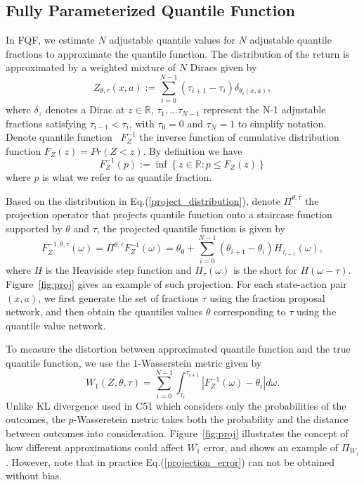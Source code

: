 \documentclass{article}
\begin{document}
\subsection{Fully Parameterized Quantile Function}
In FQF, we estimate $N$ adjustable quantile values for $N$ adjustable quantile fractions to approximate the quantile function. The distribution of the return is approximated by a weighted mixture of $N$ Diracs given by
\begin{equation}
\label{project_distribution}
    Z_{\theta, \tau}(x, a):=\sum_{i=0}^{N-1}(\tau_{i+1} - \tau_{i})\delta_{\theta_i(x, a)},
\end{equation}
where $\delta_z$ denotes a Dirac at $z \in \mathbb{R}$, $\tau_1,...\tau_{N-1}$ represent the N-1 adjustable fractions satisfying $\tau_{i-1} < \tau_i$, with $\tau_0=0$ and $\tau_N=1$ to simplify notation. Denote quantile function~\citep{muller1997integral} $F^{-1}_Z$ the inverse function of cumulative distribution function $F_Z(z)=Pr(Z<z)$. By definition we have
\begin{equation*}
   F_{Z}^{-1}(p) :=\inf \left\{z \in \mathbb{R} : p \leq F_{Z}(z)\right\}
\end{equation*}
where $p$ is what we refer to as quantile fraction.

Based on the distribution in Eq.(\ref{project_distribution}), denote $\Pi^{\theta, \tau}$ the projection operator that projects quantile function onto a staircase function supported by $\theta$ and $\tau$, the projected quantile function is given by
\begin{equation*}
    F^{-1,\theta,\tau}_{Z}(\omega)=\Pi^{\theta, \tau} F^{-1}_{Z}(\omega)=
    \theta_0+\sum_{i=0}^{N-1} (\theta_{i+1}-\theta_{i})H_{\tau_{i+1}}(\omega),
\end{equation*}
where $H$ is the Heaviside step function and $H_\tau(\omega)$ is the short for $H(\omega-\tau)$. Figure~\ref{fig:proj} gives an example of such projection. For each state-action pair $(x,a)$, we first generate the set of fractions $\tau$ using the fraction proposal network, and then obtain the quantiles values $\theta$ corresponding to $\tau$ using the quantile value network. 

To measure the distortion between approximated quantile function and the true quantile function, we use the $1$-Wasserstein metric given by
\begin{equation}
\label{projection_error}
    W_{1}(Z, \theta, \tau)=\sum_{i=0}^{N-1} \int_{\tau_{i}}^{\tau_{i+1}}\left|F^{-1}_{Z}(\omega)-\theta_{i}\right| d \omega.
\end{equation}
Unlike KL divergence used in C51 which considers only the probabilities of the outcomes, the $p$-Wasseretein metric takes both the probability and the distance between outcomes into consideration. Figure~\ref{fig:proj} illustrates the concept of how different approximations could affect $W_1$ error, and shows an example of $\Pi_{W_1}$. However, note that in practice Eq.(\ref{projection_error}) can not be obtained without bias.
\end{document}
